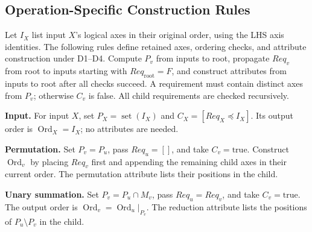 \subsection{Operation-Specific Construction Rules}
\label{app:canonical-axis-rules}
\label{app:ordering-rules}
\label{app:attribute-construction-rules}
Let $I_X$ list input $X$'s logical axes in their original order, using the
LHS axis identities. The following rules define retained axes, ordering
checks, and attribute construction under D1--D4. Compute $P_v$ from inputs
to root, propagate $Req_v$ from root to inputs starting with
$Req_{\mathrm{root}}=F$, and construct attributes from inputs to root after
all checks succeed. A requirement must contain distinct axes from $P_v$;
otherwise $C_v$ is false. All child requirements are checked recursively.

\noindent\textbf{Input.}
For input $X$, set $P_X=\operatorname{set}(I_X)$ and
$C_X=[Req_X\preceq I_X]$. Its output order is
$\operatorname{Ord}_X=I_X$; no attributes are needed.

\noindent\textbf{Permutation.}
Set $P_v=P_u$, pass $Req_u=[]$, and take $C_v=\mathrm{true}$.
Construct $\operatorname{Ord}_v$ by placing $Req_v$ first and appending
the remaining child axes in their current order. The permutation attribute
lists their positions in the child.

\noindent\textbf{Unary summation.}
Set $P_v=P_u\cap M_v$, pass $Req_u=Req_v$, and take
$C_v=\mathrm{true}$. The output order is
$\operatorname{Ord}_v=\operatorname{Ord}_u|_{P_v}$.
The reduction attribute lists the positions of $P_u\setminus P_v$
in the child.

